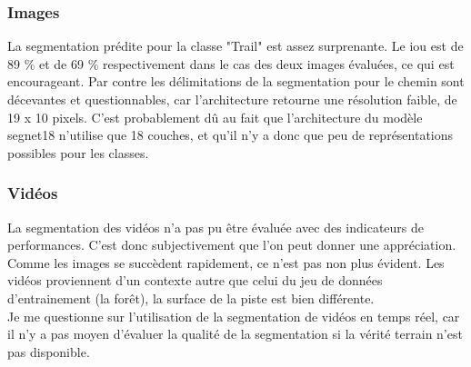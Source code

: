 \subsubsection{Images}
La segmentation prédite pour la classe "Trail" est assez surprenante. Le \acrshort{iou} est de 89 \% et de 69 \% respectivement dans le cas des deux images évaluées, ce qui est encourageant. Par contre les délimitations de la segmentation pour le chemin sont décevantes et questionnables, car l'architecture retourne une résolution faible, de 19 x 10 pixels. C'est probablement dû au fait que l'architecture du modèle segnet18 n'utilise que 18 couches, et qu'il n'y a donc que peu de représentations possibles pour les classes. 
\subsubsection{Vidéos}
La segmentation des vidéos n'a pas pu être évaluée avec des indicateurs de performances. C'est donc subjectivement que l'on peut donner une appréciation. Comme les images se succèdent rapidement, ce n'est pas non plus évident. Les vidéos proviennent d'un contexte autre que celui du jeu de données d'entrainement (la forêt), la surface de la piste est bien différente. 
\vspace{\baselineskip}
\\
\noindent Je me questionne sur l'utilisation de la segmentation de vidéos en temps réel, car il n'y a pas moyen d'évaluer la qualité de la segmentation si la vérité terrain n'est pas disponible.